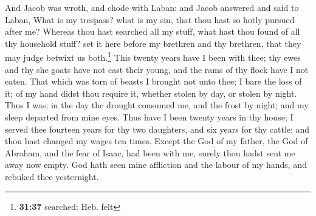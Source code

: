  And Jacob was wroth, and chode with Laban: and Jacob
answered and said to Laban, What is my trespass? what is my sin, that
thou hast so hotly pursued after me?  Whereas thou hast
searched all my stuff, what hast thou found of all thy household stuff?
set it here before my brethren and thy brethren, that they may judge
betwixt us both.\footnote{\textbf{31:37} searched: Heb. felt}
 This twenty years have I been with thee; thy ewes and
thy she goats have not cast their young, and the rams of thy flock have
I not eaten.  That which was torn of beasts I brought not
unto thee; I bare the loss of it; of my hand didst thou require it,
whether stolen by day, or stolen by night.  Thus I was;
in the day the drought consumed me, and the frost by night; and my sleep
departed from mine eyes.  Thus have I been twenty years
in thy house; I served thee fourteen years for thy two daughters, and
six years for thy cattle: and thou hast changed my wages ten times.
 Except the God of my father, the God of Abraham, and the
fear of Isaac, had been with me, surely thou hadst sent me away now
empty. God hath seen mine affliction and the labour of my hands, and
rebuked thee yesternight.


